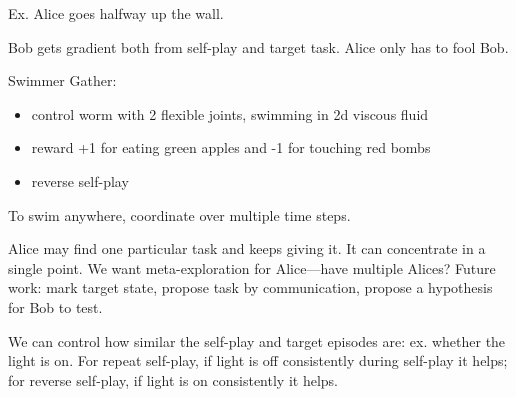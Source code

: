 Ex. Alice goes halfway up the wall.



Bob gets gradient both from self-play and target task. Alice only has to fool Bob.

Swimmer Gather:
\begin{itemize}
\item
control worm with 2 flexible joints, swimming in 2d viscous fluid
\item
reward +1 for eating green apples and -1 for touching red bombs
\item
reverse self-play
\end{itemize}
To swim anywhere, coordinate over multiple time steps. 


Alice may find one particular task and keeps giving it. It can concentrate in a single point.
We want meta-exploration for Alice---have multiple Alices? 
Future work: mark target state, propose task by communication, propose a hypothesis for Bob to test.

We can control how similar the self-play and target episodes are: ex. whether the light is on. For repeat self-play, if light is off consistently during self-play it helps; for reverse self-play, if light is on consistently it helps. %



